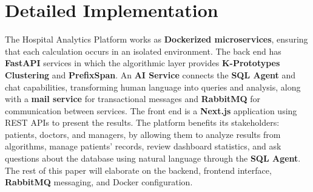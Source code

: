 \section{Detailed Implementation}

The Hospital Analytics Platform works as \textbf{Dockerized microservices}, ensuring that each calculation occurs in an isolated environment. The back end has \textbf{FastAPI} services in which the algorithmic layer provides \textbf{K-Prototypes Clustering} and \textbf{PrefixSpan}. An \textbf{AI Service} connects the \textbf{SQL Agent} and chat capabilities, transforming human language into queries and analysis, along with a \textbf{mail service} for transactional messages and \textbf{RabbitMQ} for communication between services. The front end is a \textbf{Next.js} application using REST APIs to present the results. The platform benefits its stakeholders: patients, doctors, and managers, by allowing them to analyze results from algorithms, manage patients' records, review dashboard statistics, and ask questions about the database using natural language through the \textbf{SQL Agent}. The rest of this paper will elaborate on the backend, frontend interface, \textbf{RabbitMQ} messaging, and Docker configuration.






